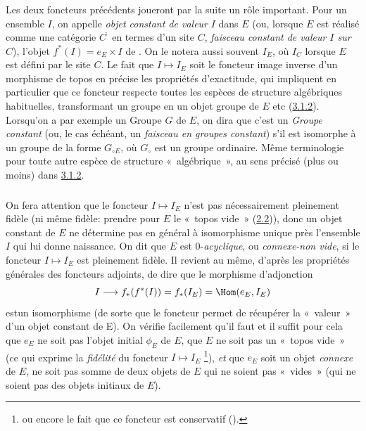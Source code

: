 \documentclass[10pt]{../fichiers-configuration-latex/smfart}
\begin{document}
\setcounter{subsubsection}{3}
\subsubsection{}
Les deux foncteurs précédents joueront par la suite un rôle
important. Pour un ensemble $I$, on appelle \emph{objet constant de
valeur} $I$ dans $E$ (ou, lorsque $E$ est réalisé comme une
catégorie $C^{\widetilde{\phantom{,}}}$ en termes d'un site $C$,
\emph{faisceau constant de valeur $I$ sur $C$}), l'objet
$f^{\ast}(I)=e_E\times I$ de . On le notera aussi
souvent $I_E$, où $I_C$ lorsque $E$ est défini par le site $C$.
Le fait que $I\mapsto I_E$ soit le foncteur image inverse d'un
morphisme de topos en précise les propriétés d'exactitude, qui
impliquent en particulier que ce foncteur respecte toutes les
espèces de structure algébriques habituelles, transformant un
groupe en un objet groupe de $E$ etc (\hyperref[IV.subsubsec3.1.2]{3.1.2}).
Lorsqu'on a par exemple un Groupe $G$ de $E$, on dira que c'est un
\emph{Groupe constant} (ou, le cas échéant, un \emph{faisceau en
groupes constant}) s'il est isomorphe à un groupe de la forme
$G_{\circ E}$, où $G_{\circ}$ est un groupe ordinaire. Même
terminologie pour toute autre espèce de structure
« algébrique », au sens précisé (plus ou moins) dans
\hyperref[IV.subsubsec3.1.2]{3.1.2}.

\subsubsection{}
On fera attention que le foncteur $I\mapsto I_E$ n'est pas
nécessairement pleinement fidèle (ni même fidèle: prendre
pour $E$ le « topos vide »  (\hyperref[IV.subsec2.2]{2.2})), donc un objet
constant de $E$ ne détermine pas en général à isomorphisme
unique près l'ensemble $I$ qui lui donne naissance. On dit que $E$
est $0$-\emph{acyclique}, ou \emph{connexe-non vide}, si le foncteur
$I\mapsto I_E$ est pleinement fidèle. Il revient au même,
d'après les propriétés générales des foncteurs adjoints, de
dire que le morphisme d'adjonction
$$
I\longrightarrow f_{\ast}(f^{\ast}(I))=f_{\ast}(I_E)=\Hom(e_E, I_E)
$$
est\pageoriginale un isomorphisme (de sorte que le foncteur
 permet de récupérer la « valeur »  d'un objet
constant de E). On vérifie facilement qu'il faut et il suffit pour
cela que $e_E$ ne soit pas l'objet initial $\phi_E$ de $E$, \ie que
$E$ ne soit pas un « topos vide » (ce qui exprime la
\emph{fidélité} du foncteur $I\mapsto I_E$ \footnote[1]{ou encore le
fait que ce foncteur est conservatif ().}), \emph{et}
que $e_E$ soit un objet \emph{connexe} de $E$, \ie ne soit pas somme
de deux objets de $E$ qui ne soient pas « vides » (\ie qui ne
soient pas des objets initiaux de $E$).
\end{document}

